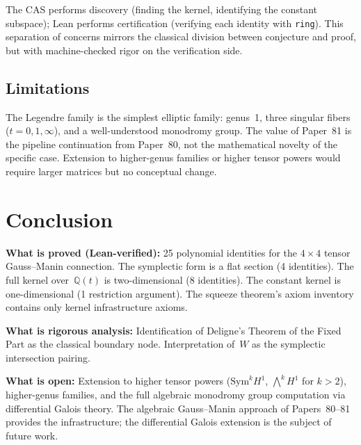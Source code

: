 \documentclass[11pt]{article}
\theoremstyle{plain}
\theoremstyle{definition}
\theoremstyle{remark}
\newcommand{\Q}{\mathbb{Q}}
\newcommand{\Sym}{\mathrm{Sym}}
\begin{document}
The CAS performs discovery (finding the kernel, identifying
the constant subspace); Lean performs certification
(verifying each identity with \texttt{ring}).  This
separation of concerns mirrors the classical division
between conjecture and proof, but with machine-checked
rigor on the verification side.

\subsection{Limitations}

The Legendre family is the simplest elliptic family: genus~1,
three singular fibers ($t = 0, 1, \infty$), and a well-understood
monodromy group.  The value of Paper~81 is the pipeline
continuation from Paper~80, not the mathematical novelty
of the specific case.  Extension to higher-genus families
or higher tensor powers would require larger matrices but
no conceptual change.

\section{Conclusion}\label{sec:conclusion}

\textbf{What is proved (Lean-verified):}
25 polynomial identities for the $4 \times 4$ tensor
Gauss--Manin connection.  The symplectic form is a flat
section (4 identities).  The full kernel over~$\Q(t)$ is
two-dimensional (8 identities).  The constant kernel is
one-dimensional (1 restriction argument).  The squeeze
theorem's axiom inventory contains only kernel
infrastructure axioms.

\textbf{What is rigorous analysis:}
Identification of Deligne's Theorem of the Fixed Part as
the classical boundary node.  Interpretation of~$W$ as the
symplectic intersection pairing.

\textbf{What is open:}
Extension to higher tensor powers ($\Sym^k H^1$,
$\bigwedge^k H^1$ for $k > 2$),
higher-genus families, and the full algebraic
monodromy group computation via differential Galois theory.
The algebraic Gauss--Manin approach of Papers~80--81
provides the infrastructure; the differential Galois
extension is the subject of future work.
\end{document}
